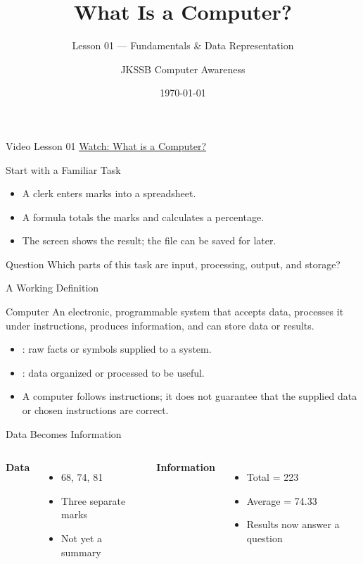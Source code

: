 \documentclass[aspectratio=169]{beamer}
\title{What Is a Computer?}
\subtitle{Lesson 01 --- Fundamentals \& Data Representation}
\author{JKSSB Computer Awareness}
\date{\today}
\begin{document}
\frame{\titlepage}

\begin{frame}{Video Lesson 01}
  \centering
  \Large\href{https://youtu.be/EdRZK57oqpo}{Watch: What is a Computer?}
\end{frame}

\begin{frame}{Start with a Familiar Task}
  \begin{itemize}
    \item A clerk enters marks into a spreadsheet.
    \item A formula totals the marks and calculates a percentage.
    \item The screen shows the result; the file can be saved for later.
  \end{itemize}
  \vspace{0.4cm}
  \begin{block}{Question}
    Which parts of this task are input, processing, output, and storage?
  \end{block}
\end{frame}

\begin{frame}{A Working Definition}
  \begin{block}{Computer}
    An electronic, programmable system that accepts data, processes it under
    instructions, produces information, and can store data or results.
  \end{block}
  \begin{itemize}
    \item {}: raw facts or symbols supplied to a system.
    \item {}: data organized or processed to be useful.
    \item A computer follows instructions; it does not guarantee that the
      supplied data or chosen instructions are correct.
  \end{itemize}
\end{frame}

\begin{frame}{Data Becomes Information}
  \begin{columns}[T]
      \textbf{Data}
      \begin{itemize}
        \item 68, 74, 81
        \item Three separate marks
        \item Not yet a summary
      \end{itemize}
      \textbf{Information}
      \begin{itemize}
        \item Total = 223
        \item Average = 74.33
        \item Results now answer a question
      \end{itemize}
  \end{columns}
  \vspace{0.3cm}
\end{frame}
\end{document}
